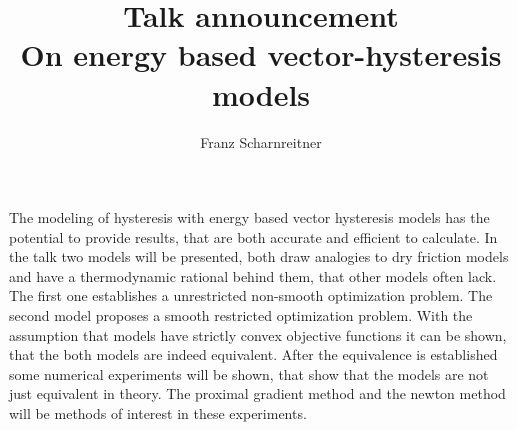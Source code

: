 \documentclass[UTF8]{article}
\date{\displaydate{date}}
\title{%
Talk announcement \\
\large On energy based vector-hysteresis models}
\author{Franz Scharnreitner}
\begin{document}
\maketitle
The modeling of hysteresis with energy based vector hysteresis models has the potential to provide results, that are both accurate and efficient to calculate. In the talk two models will be presented, both draw analogies to dry friction models and have a thermodynamic rational behind them, that other models often lack. The first one establishes a unrestricted non-smooth optimization problem. The second model proposes a smooth restricted optimization problem. With the assumption that models have strictly convex objective functions it can be shown, that the both models are indeed equivalent. After the equivalence is established some numerical experiments will be shown, that show that the models are not just equivalent in theory. The proximal gradient method and the newton method will be methods of interest in these experiments. 
\end{document}
